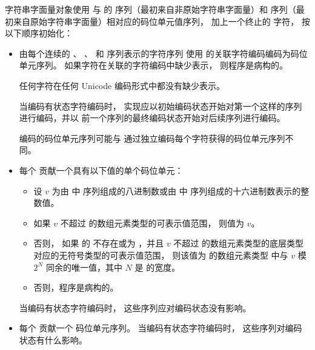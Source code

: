 \pnum
{}%
%
字符串字面量对象使用
与  的  序列（最初来自非原始字符串字面量）和
 序列（最初来自原始字符串字面量）相对应的码位单元值序列，
加上一个终止的  字符，
按以下顺序初始化：
\begin{itemize}
\item
由每个连续的
、
、
 和
 序列表示的字符序列
使用  的关联字符编码编码为码位单元序列。
如果字符在关联的字符编码中缺少表示，
则程序是病构的。
\begin{note}
任何字符在任何 Unicode 编码形式中都没有缺少表示。
\end{note}
当编码有状态字符编码时，
实现应以初始编码状态开始对第一个这样的序列进行编码，并以
前一个序列的最终编码状态开始对后续序列进行编码。
\begin{note}
编码的码位单元序列可能与
通过独立编码每个字符获得的码位单元序列不同。
\end{note}
\item
每个 
贡献一个具有以下值的单个码位单元：
\begin{itemize}
\item
设 $v$ 为由
 中
 序列组成的八进制数或由
 中
 序列组成的十六进制数表示的整数值。
\item
如果 $v$ 不超过
 的数组元素类型的可表示值范围，
则值为 $v$。
\item
否则，
如果  的 
不存在或为 ，并且
$v$ 不超过  的数组元素类型的底层类型对应的无符号类型的可表示值范围，
则该值为  的数组元素类型 
中与 $v$ 模 $2^N$ 同余的唯一值，其中 $N$ 是  的宽度。
\item
否则，程序是病构的。
\end{itemize}
当编码有状态字符编码时，
这些序列应对编码状态没有影响。
\item
每个 
贡献一个
码位单元序列。
当编码有状态字符编码时，
这些序列对编码状态有什么影响。
\end{itemize}

